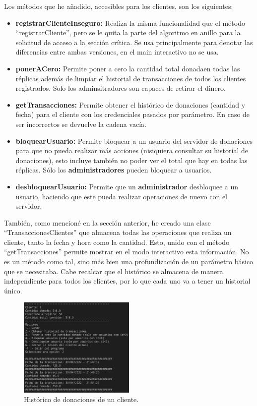 \documentclass{article}
\begin{document}
Los métodos que he añadido, accesibles para los clientes, son los siguientes:

\begin{itemize}
    \item \textbf{registrarClienteInseguro: }Realiza la misma funcionalidad que el método ``registrarCliente'', pero se le quita la parte del algoritmo en anillo para la solicitud de acceso a la sección crítica. Se usa principalmente para denotar las diferencias entre ambas versiones, en el main interactivo no se usa.
    \item \textbf{ponerACero: }Permite poner a cero la cantidad total donadaen todas las réplicas además de limpiar el historial de transacciones de todos los clientes registrados. Solo los adminsitradores son capaces de retirar el dinero.
    \item \textbf{getTransacciones: }Permite obtener el histórico de donaciones (cantidad y fecha) para el cliente con los credenciales pasados por parámetro. En caso de ser incorrectos se devuelve la cadena vacía.
    \item \textbf{bloquearUsuario: }Permite bloquear a un usuario del servidor de donaciones para que no pueda realizar más acciones (nisiquiera consultar su historial de donaciones), esto incluye también no poder ver el total que hay en todas las réplicas. Sólo los \textbf{administradores} pueden bloquear a usuarios.
    \item \textbf{desbloquearUsuario: }Permite que un \textbf{administrador} desbloquee a un usuario, haciendo que este pueda realizar operaciones de nuevo con el servidor.
\end{itemize}

También, como mencioné en la sección anterior, he creado una clase ``TransaccionesClientes'' que almacena todas las operaciones que realiza un cliente, tanto la fecha y hora como la cantidad. Esto, unido con el método ``getTransacciones'' permite mostrar en el modo interactivo esta información. No es un método como tal, sino más bien una profundización de un parámetro básico que se necesitaba. Cabe recalcar que el histórico se almacena de manera independiente para todos los clientes, por lo que cada uno va a tener un historial único.

\begin{figure}[H]
    \centering
    \includegraphics[width=0.5\textwidth]{imagenes/historico.png}
    \caption{Histórico de donaciones de un cliente.}
\end{figure}
\end{document}
